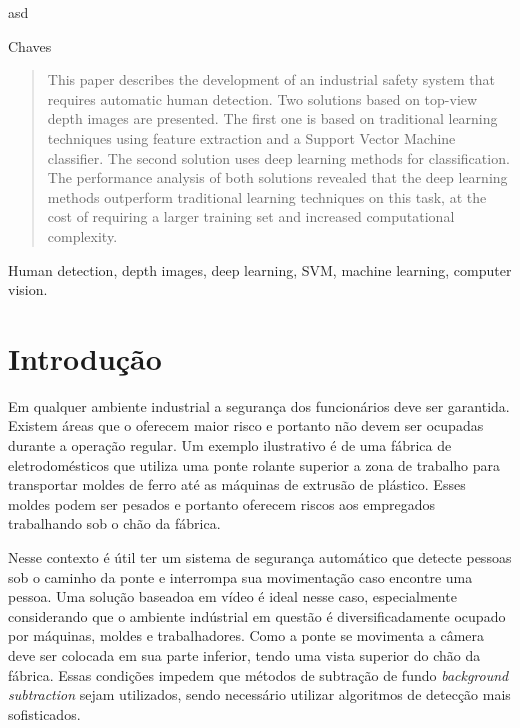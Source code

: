 \begin{resumo}
asd
\end{resumo}

\begin{chave}
Chaves
\end{chave}

\begin{abstract}
This paper describes the development of an industrial safety system that requires automatic human detection. Two solutions based on top-view depth images are presented. The first one is based on traditional learning techniques using feature extraction and a Support Vector Machine classifier. The second solution uses deep learning methods for classification. The performance analysis of both solutions revealed that the deep learning methods outperform traditional learning techniques on this task, at the cost of requiring a larger training set and increased computational complexity.
\end{abstract}

\begin{keywords}
  Human detection, depth images, deep learning, SVM, machine learning, computer vision.
\end{keywords}

\section{Introdução}
  Em qualquer ambiente industrial a segurança dos funcionários deve ser garantida. Existem áreas que o oferecem maior risco e portanto não devem ser ocupadas durante a operação regular. Um exemplo ilustrativo é de uma fábrica de eletrodomésticos que utiliza uma ponte rolante superior a zona de trabalho para transportar moldes de ferro até as máquinas de extrusão de plástico. Esses moldes podem ser pesados e portanto oferecem riscos aos empregados trabalhando sob o chão da fábrica.

  Nesse contexto é útil ter um sistema de segurança automático que detecte pessoas sob o caminho da ponte e interrompa sua movimentação caso encontre uma pessoa. Uma solução baseadoa em vídeo é ideal nesse caso, especialmente considerando que o ambiente indústrial em questão é diversificadamente ocupado por máquinas, moldes e trabalhadores. Como a ponte se movimenta a câmera deve ser colocada em sua parte inferior, tendo uma vista superior do chão da fábrica. Essas condições impedem que métodos de subtração de fundo \textit{background subtraction} sejam utilizados, sendo necessário utilizar algoritmos de detecção mais sofisticados.

